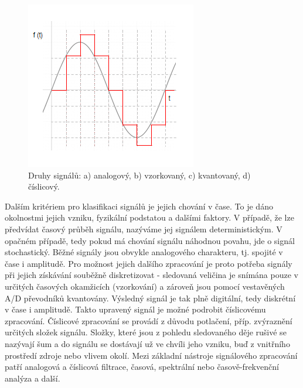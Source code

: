 \documentclass[a4paper, 12pt]{article}
\begin{document}
\begin{figure}[ht!]
\begin{minipage}[b]{5cm}
   \subcaption{}
\end{minipage}\hspace{1cm}
\begin{minipage}[b]{5cm}
  \centering
  \includegraphics[width=\linewidth]{číslicový.png}
  \subcaption{}
\end{minipage}
\caption{Druhy signálů: a) analogový, b) vzorkovaný, c) kvantovaný, d) číslicový.}
\label{fig:signal}
\end{figure}


Dalším kritériem pro klasifikaci signálů je jejich chování v čase. To je dáno okolnostmi jejich vzniku, fyzikální podstatou a dalšími faktory. V případě, že lze předvídat časový průběh signálu, nazýváme jej signálem deterministickým. V opačném případě, tedy pokud má chování signálu náhodnou povahu, jde o signál stochastický.
Běžné signály jsou obvykle analogového charakteru, tj. spojité v čase i amplitudě. Pro možnost jejich dalšího zpracování je proto potřeba signály při jejich získávání souběžně diskretizovat - sledovaná veličina je snímána pouze v určitých časových okamžicích (vzorkování) a zároveň jsou pomocí vestavěných A/D převodníků kvantovány. Výsledný signál je tak plně digitální, tedy diskrétní v čase i amplitudě. Takto upravený signál je možné podrobit číslicovému zpracování.
Číslicové zpracování se provádí z důvodu potlačení, příp. zvýraznění určitých složek signálu. Složky, které jsou z pohledu sledovaného děje rušivé se nazývají šum a do signálu se dostávají už ve chvíli jeho vzniku, buď z vnitřního prostředí zdroje nebo vlivem okolí. Mezi základní nástroje signálového zpracování patří
analogová a číslicová filtrace, časová, spektrální nebo časově-frekvenční analýza a další.
\end{document}

